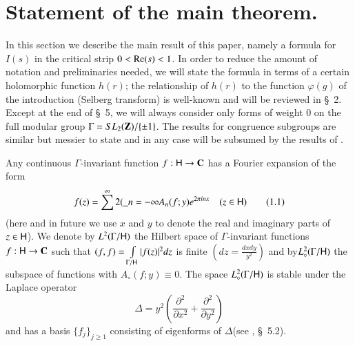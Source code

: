 \section{Statement of the main theorem.}\label{art11-sec1}
In this section we describe the main result of this paper, namely a formula for $I(s)$ in the critical strip $0< \operatorname{Re} (s)<1$. In order to reduce the amount of notation and preliminaries needed, we will state the formula in terms of a certain holomorphic function $h(r)$; the relationship of $h(r)$ to the function $\varphi (g)$ of the introduction (Selberg transform) is well-known and will be reviewed in \S~2. Except at the end of \S~5, we will always consider only forms of weight 0 on the full modular group $\Gamma = SL_2(\mathbf{Z})/ \{\pm1\}$. The results for congruence subgroups are similar but messier to state and in any case will be subsumed by the results of \cite{art11-3}.

Any continuous $\Gamma$-invariant function $f: \mathsf{H} \to \mathbf{C}$ has a Fourier expansion of the form 
\begin{equation*}
f(z) = \sum\limits^\infty 2 (\_{n = - \infty} A_n (f;y) e^{2\pi in x} \quad (z\in \mathsf{H}) \tag{1.1}\label{art11-eq1.1}
\end{equation*}
(here and in future we use $x$ and $y$ to denote the real and imaginary parts of $z \in \mathsf{H}$). We denote by $L^2 (\Gamma/ \mathsf{H})$ the Hilbert space of $\Gamma$-invariant functions $f: \mathsf{H} \to \mathbf{C}$ such that $(f,f) = \int\limits_{\Gamma / \mathsf{H}} |f(z)|^2dz$ is finite $\left(dz = \frac{dx dy}{y^2}\right)$ and by\pageoriginale $L^2_\circ (\Gamma / \mathsf{H})$ the subspace of functions with $A_\circ (f;y ) \equiv 0$. The space $L^2_\circ (\Gamma / \mathsf{H})$ is stable under the Laplace operator
$$
\Delta = y^2 \left(\frac{\partial^2}{\partial x^2} + \frac{\partial^2}{\partial y^2} \right)
$$
and has a basis $\{f_j\}_{j \geqslant 1}$ consisting of eigenforms of $\Delta$(see \cite{art11-4}, \S~5.2). 

